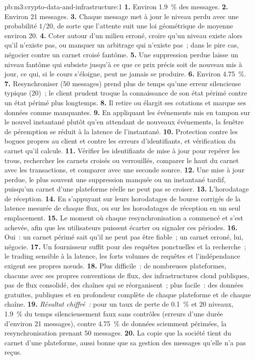 \begin{solution}{pb:m3:crypto-data-and-infrastructure:1}
\textbf{1.} Environ 1.9~\% des messages. \textbf{2.} Environ 21 messages. \textbf{3.} Chaque message met à jour le niveau perdu avec une probabilité $1/20$, de sorte que l'attente suit
une loi géométrique de moyenne environ 20. \textbf{4.} Coter autour d'un milieu erroné, croire qu'un niveau existe alors qu'il n'existe pas, ou manquer un arbitrage qui n'existe pas~; dans le
pire cas, négocier contre un carnet croisé fantôme. \textbf{5.} Une suppression perdue laisse un niveau fantôme qui subsiste jusqu'à ce que ce prix précis soit de nouveau mis à jour,
ce qui, si le cours s'éloigne, peut ne jamais se produire. \textbf{6.} Environ 4.75~\%. \textbf{7.} Resynchroniser (50 messages) prend plus de temps qu'une erreur silencieuse typique
(20)~; le client prudent troque la connaissance de son état périmé contre un état périmé plus longtemps. \textbf{8.} Il retire ou élargit ses cotations et marque ses données comme manquantes.
\textbf{9.} En appliquant les événements mis en tampon sur le nouvel instantané plutôt qu'en attendant de nouveaux événements, la fenêtre de péremption se réduit à la latence de l'instantané.
\textbf{10.} Protection contre les bogues propres au client et contre les erreurs d'identifiants, et vérification du carnet qu'il calcule. \textbf{11.} Vérifier les identifiants de
mise à jour pour repérer les trous, rechercher les carnets croisés ou verrouillés, comparer le haut du carnet avec les transactions, et comparer avec une seconde source. \textbf{12.} Une mise à jour perdue,
le plus souvent une suppression manquée ou un instantané tardif, puisqu'un carnet d'une plateforme réelle ne peut pas se croiser. \textbf{13.} L'horodatage de réception. \textbf{14.} En s'appuyant sur leurs horodatages
de bourse corrigés de la latence mesurée de chaque flux, ou sur les horodatages de réception en un seul emplacement. \textbf{15.} Le moment où chaque resynchronisation a commencé et s'est achevée,
afin que les utilisateurs puissent écarter ou signaler ces périodes. \textbf{16.} Oui~: un carnet périmé sait qu'il ne peut pas être fiable~; un carnet erroné, lui, négocie. \textbf{17.} Un fournisseur suffit
pour des requêtes ponctuelles et la recherche~; le trading sensible à la latence, les forts volumes de requêtes et l'indépendance exigent ses propres nœuds. \textbf{18.} Plus difficile~: de nombreuses plateformes, chacune avec
ses propres conventions de flux, des infrastructures cloud publiques, pas de flux consolidé, des chaînes qui se réorganisent~; plus facile~: des données gratuites, publiques et en profondeur complète de chaque plateforme et de chaque chaîne.
\textbf{19.} \emph{Résultat chiffré~:} pour un taux de perte de 0.1~\% et 20 niveaux, 1.9~\% du temps silencieusement faux sans contrôles (erreurs d'une durée d'environ 21 messages),
contre 4.75~\% de données sciemment périmées, la resynchronisation prenant 50 messages. \textbf{20.} La copie que la société tient du carnet d'une plateforme, aussi bonne que sa gestion des
messages qu'elle n'a pas reçus.
\end{solution}

